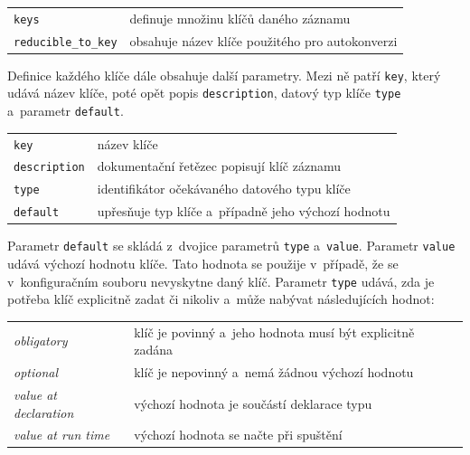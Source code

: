\documentclass[FM,bw,DP]{tulthesis}
\begin{document}
\vspace{0.5cm}
\begin{tabular}{m{4cm}@{}l}
\texttt{keys}\dotfill & definuje množinu klíčů daného záznamu \\
\texttt{reducible\_to\_key}\dotfill & obsahuje název klíče použitého pro autokonverzi \\
\end{tabular}
\vspace{0.5cm}

Definice každého klíče dále obsahuje další parametry. Mezi ně patří \texttt{key}, který udává název klíče, poté opět popis \texttt{description}, datový typ klíče \texttt{type} a~parametr \texttt{default}.

\vspace{0.5cm}
\begin{tabular}{m{4cm}@{}l}
\texttt{key}\dotfill & název klíče \\
\texttt{description}\dotfill & dokumentační řetězec popisují klíč záznamu \\
\texttt{type}\dotfill & identifikátor očekávaného datového typu klíče \\
\texttt{default}\dotfill & upřesňuje typ klíče a~případně jeho výchozí hodnotu \\
\end{tabular}
\vspace{0.5cm}

Parametr \texttt{default} se skládá z~dvojice parametrů \texttt{type} a~\texttt{value}. Parametr \texttt{value} udává výchozí hodnotu klíče. Tato hodnota se použije v~případě, že se v~konfiguračním souboru nevyskytne daný klíč. Parametr \texttt{type} udává, zda je potřeba klíč explicitně zadat či nikoliv a~může nabývat následujících hodnot:

\vspace{0.5cm}
\begin{tabular}{m{4cm}@{}l}
\textit{obligatory}\dotfill & klíč je povinný a~jeho hodnota musí být explicitně zadána \\
\textit{optional}\dotfill & klíč je nepovinný a~nemá žádnou výchozí hodnotu \\
\textit{value at declaration}\dotfill & výchozí hodnota je součástí deklarace typu \\
\textit{value at run time}\dotfill & výchozí hodnota se načte při spuštění \\
\end{tabular}
\vspace{0.5cm}
\end{document}
